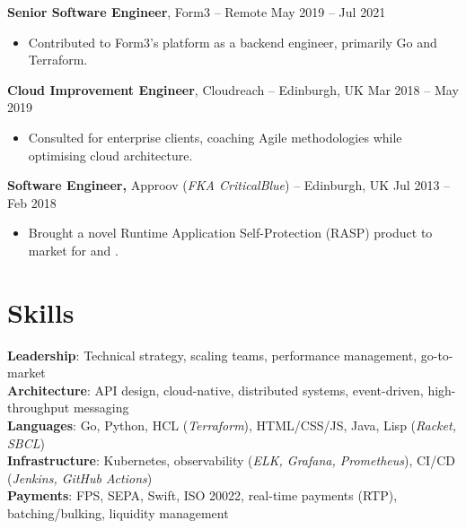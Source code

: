 \documentclass[11pt]{article}       %
\begin{document}
\textbf{Senior Software Engineer}, Form3 -- Remote \hfill May 2019 -- Jul 2021 \\
\vspace{-9pt}
\begin{itemize}
  \item Contributed to Form3's platform as a backend engineer, primarily Go and Terraform. \\
\end{itemize}

\textbf{Cloud Improvement Engineer}, Cloudreach -- Edinburgh, UK \hfill Mar 2018 -- May 2019 \\
\vspace{-9pt}
\begin{itemize}
  \item Consulted for enterprise clients, coaching Agile methodologies while optimising cloud architecture. \\
\end{itemize}

\textbf{Software Engineer,} Approov (\textit{FKA CriticalBlue}) -- Edinburgh, UK \hfill Jul 2013 -- Feb 2018 \\
\vspace{-9pt}
\begin{itemize}
  \item Brought a novel Runtime Application Self-Protection (RASP) product to market for  and . \\
\end{itemize}

\section*{Skills}
\textbf{Leadership}: Technical strategy, scaling teams, performance management, go-to-market \\
\textbf{Architecture}: API design, cloud-native, distributed systems, event-driven, high-throughput messaging \\
\textbf{Languages}: Go, Python, HCL (\textit{Terraform}), HTML/CSS/JS, Java, Lisp (\textit{Racket, SBCL}) \\
\textbf{Infrastructure}: Kubernetes, observability (\textit{ELK, Grafana, Prometheus}), CI/CD (\textit{Jenkins, GitHub Actions}) \\
\textbf{Payments}: FPS, SEPA, Swift, ISO 20022, real-time payments (RTP), batching/bulking, liquidity management \\

\vspace{-6.5pt}
\end{document}
